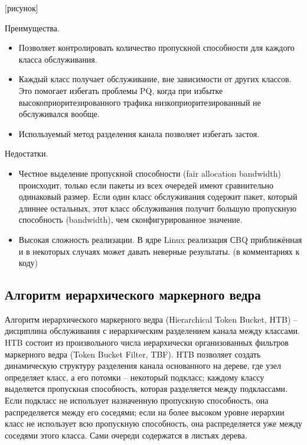 		[рисунок]

        Преимущества.
		\begin{itemize}
        	\item Позволяет контролировать количество пропускной способности для каждого
                  класса обслуживания.
        	\item Каждый класс получает обслуживание, вне зависимости от других классов. Это
                  помогает избегать проблемы PQ, когда при избытке высокоприоритезированного
                  трафика низкоприоритезированный не обслуживался вообще.
			\item Используемый метод разделения канала позволяет избегать застоя.
		\end{itemize}

        Недостатки.
		\begin{itemize}
            \item Честное выделение пропускной способности (fair allocation bandwidth) происходит, только если
                  пакеты из всех очередей имеют сравнительно одинаковый размер. Если один класс
                  обслуживания содержит пакет, который длиннее остальных, этот класс обслуживания
                  получит большую пропускную способность (bandwidth), чем сконфигурированное значение.
			\item Высокая сложность реализации. В ядре Linux реализация СBQ приближённая и
				  в некоторых случаях может давать неверные результаты. (в комментариях к коду)
		\end{itemize}

	\subsection{Алгоритм иерархического маркерного ведра}

        Алгоритм иерархического маркерного ведра (Hierarchical Token Bucket, HTB) --
        дисциплина обслуживания с иерархическим разделением канала между классами. HTB
        состоит из произвольного числа иерархически организованных фильтров
        маркерного ведра (Token Bucket Filter, TBF). HTB позволяет создать динамическую
    	структуру разделения канала основанного
        на дереве, где узел определяет класс, а его потомки -- некоторый подкласс;
        каждому классу выделяется пропускная способность, которая разделяется между
        подклассами. Если подкласс не использует назначенную пропускную способность,
        она распределяется между его соседями; если на более высоком уровне иерархии
        класс не использует всю пропускную способность, она распределяется уже
        между соседями этого класса. Сами очереди содержатся в листьях дерева.

